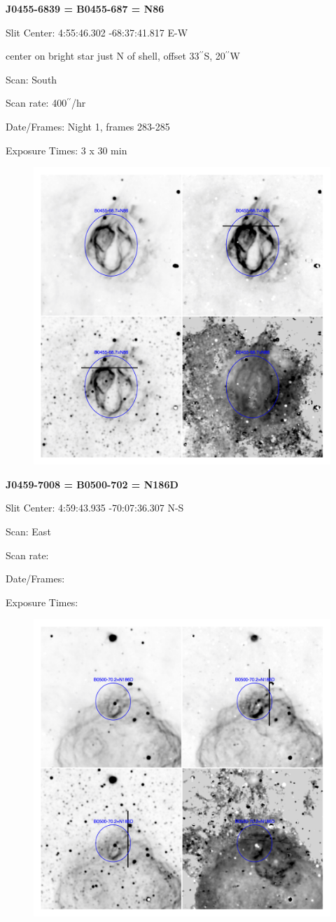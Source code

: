 \documentclass[11pt]{article}
\newcommand{\arcsec}{$^{\prime\prime}$}
\begin{document}
\newpage
{\bf J0455-6839 = B0455-687 = N86}

Slit Center:   4:55:46.302    -68:37:41.817     E-W

center on bright star just N of shell, offset 33\arcsec S, 20\arcsec W

Scan:  South

Scan rate:  400\arcsec/hr

Date/Frames:  Night 1, frames 283-285

Exposure Times:  3 x 30 min

\begin{figure}
\includegraphics[width=11.cm]{snapshots/B0455-687.png}
\end{figure}


\newpage
{\bf J0459-7008 = B0500-702 = N186D}

Slit Center:   4:59:43.935    -70:07:36.307     N-S

Scan:  East

Scan rate:  

Date/Frames:

Exposure Times:  

\begin{figure}
\includegraphics[width=11.cm]{snapshots/B0500-702.png}
\end{figure}
\end{document}
